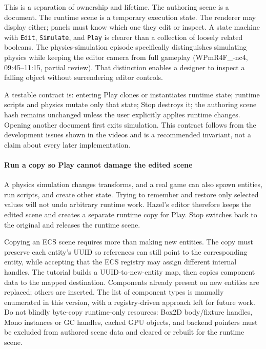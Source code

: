 This is a separation of ownership and lifetime. The authoring scene is a document. The runtime scene is a temporary execution state. The renderer may display either; panels must know which one they edit or inspect. A state machine with \texttt{Edit}, \texttt{Simulate}, and \texttt{Play} is clearer than a collection of loosely related booleans. The physics-simulation episode specifically distinguishes simulating physics while keeping the editor camera from full gameplay (WPmR4F\_-nc4, 09:45--11:15, partial review). That distinction enables a designer to inspect a falling object without surrendering editor controls.

A testable contract is: entering Play clones or instantiates runtime state; runtime scripts and physics mutate only that state; Stop destroys it; the authoring scene hash remains unchanged unless the user explicitly applies runtime changes. Opening another document first exits simulation. This contract follows from the development issues shown in the videos and is a recommended invariant, not a claim about every later implementation.

\paragraph{Run a copy so Play cannot damage the edited scene}\label{run-a-copy-so-play-cannot-damage-the-edited-scene}

A physics simulation changes transforms, and a real game can also spawn entities, run scripts, and create other state. Trying to remember and restore only selected values will not undo arbitrary runtime work. Hazel's editor therefore keeps the edited scene and creates a separate runtime copy for Play. Stop switches back to the original and releases the runtime scene.

Copying an ECS scene requires more than making new entities. The copy must preserve each entity's UUID so references can still point to the corresponding entity, while accepting that the ECS registry may assign different internal handles. The tutorial builds a UUID-to-new-entity map, then copies component data to the mapped destination. Components already present on new entities are replaced; others are inserted. The list of component types is manually enumerated in this version, with a registry-driven approach left for future work. Do not blindly byte-copy runtime-only resources: Box2D body/fixture handles, Mono instances or GC handles, cached GPU objects, and backend pointers must be excluded from authored scene data and cleared or rebuilt for the runtime scene.

